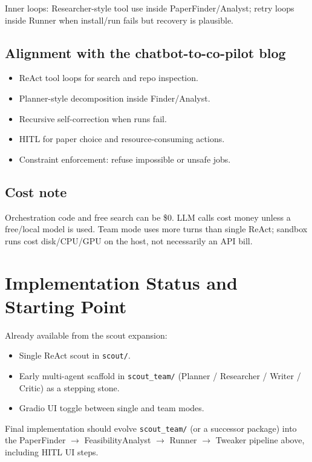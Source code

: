 \documentclass[11pt,a4paper]{article}
\begin{document}
Inner loops: Researcher-style tool use inside PaperFinder/Analyst;
retry loops inside Runner when install/run fails but recovery is plausible.

\subsection{Alignment with the chatbot-to-co-pilot blog}
\begin{itemize}[leftmargin=*]
  \item ReAct tool loops for search and repo inspection.
  \item Planner-style decomposition inside Finder/Analyst.
  \item Recursive self-correction when runs fail.
  \item HITL for paper choice and resource-consuming actions.
  \item Constraint enforcement: refuse impossible or unsafe jobs.
\end{itemize}

\subsection{Cost note}
Orchestration code and free search can be \$0. LLM calls cost money unless
a free/local model is used. Team mode uses more turns than single ReAct;
sandbox runs cost disk/CPU/GPU on the host, not necessarily an API bill.

\section{Implementation Status and Starting Point}

Already available from the scout expansion:
\begin{itemize}[leftmargin=*]
  \item Single ReAct scout in \texttt{scout/}.
  \item Early multi-agent scaffold in \texttt{scout\_team/}
        (Planner / Researcher / Writer / Critic) as a stepping stone.
  \item Gradio UI toggle between single and team modes.
\end{itemize}

Final implementation should evolve \texttt{scout\_team/} (or a successor
package) into the PaperFinder $\rightarrow$ FeasibilityAnalyst $\rightarrow$
Runner $\rightarrow$ Tweaker pipeline above, including HITL UI steps.
\end{document}
